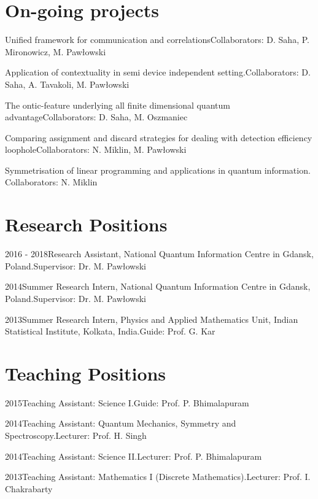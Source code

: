 \documentclass{tccv}
\begin{document}
\section{On-going projects}
\begin{yearlist}
    \item{} 
    {Unified framework for communication and correlations}{Collaborators: D. Saha, P. Mironowicz, M. Paw{\l}owski}
    \item{} 
    {Application of contextuality in semi device independent setting.}{Collaborators: D. Saha, A. Tavakoli, M. Paw{\l}owski}
    \item{}
    {The ontic-feature underlying all finite dimensional quantum advantage}{Collaborators: D. Saha, M. Oszmaniec}
    \item{}
    {Comparing assignment and discard strategies for dealing with detection efficiency loophole}{Collaborators: N. Miklin, M. Paw{\l}owski}
    \item{}
     {Symmetrisation of linear programming and applications in quantum information.}
     {Collaborators: N. Miklin}
    
\end{yearlist}

\section{Research Positions}

\begin{yearlist}
\item{2016 - 2018}{Research Assistant, National Quantum Information Centre in Gdansk, Poland.}{Supervisor: Dr. M. Paw{\l}owski}

\item{2014}{Summer Research Intern, National Quantum Information Centre in Gdansk, Poland.}{Supervisor: Dr. M. Paw{\l}owski}

\item{2013}{Summer Research Intern, Physics and Applied Mathematics Unit, Indian Statistical Institute, Kolkata, India.}{Guide: Prof. G. Kar}

\end{yearlist}

\section{Teaching Positions}

\begin{yearlist}
\item{2015}{Teaching Assistant: Science I.}{Guide: Prof. P. Bhimalapuram}

\item{2014}{Teaching Assistant: Quantum Mechanics, Symmetry and Spectroscopy.}{Lecturer: Prof. H. Singh}

\item{2014}{Teaching Assistant: Science II.}{Lecturer: Prof. P. Bhimalapuram}

\item{2013}{Teaching Assistant: Mathematics I (Discrete Mathematics).}{Lecturer: Prof. I. Chakrabarty}

\end{yearlist}
\end{document}
